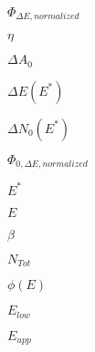 \documentclass{article}
\begin{document}
$ \Phi_{\Delta E, normalized} $
\pagebreak

$ \eta $
\pagebreak

$ \Delta A_{0} $
\pagebreak

$ \Delta E(E^{*}) $
\pagebreak

$ \Delta N_{0}(E^{*}) $
\pagebreak

$ \Phi_{0, \Delta E, normalized} $
\pagebreak

$ E^{*} $
\pagebreak

$ E $
\pagebreak

$ \beta $
\pagebreak

$ N_{Tot} $
\pagebreak

$ \phi(E) $
\pagebreak

$ E_{low} $
\pagebreak

$ E_{upp} $
\pagebreak
\end{document}

